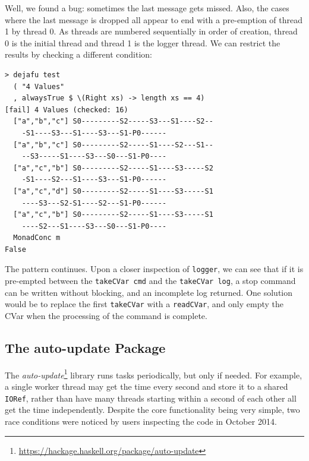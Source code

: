 Well, we found a bug: sometimes the last message gets missed. Also,
the cases where the last message is dropped all appear to end with a
pre-emption of thread 1 by thread 0. As threads are numbered
sequentially in order of creation, thread 0 is the initial thread and
thread 1 is the logger thread. We can restrict the results by checking
a different condition:

\begin{verbatim}
> dejafu test
  ( "4 Values"
  , alwaysTrue $ \(Right xs) -> length xs == 4)
[fail] 4 Values (checked: 16)
  ["a","b","c"] S0---------S2-----S3---S1----S2--
    -S1----S3---S1----S3---S1-P0------
  ["a","b","c"] S0---------S2-----S1----S2---S1--
    --S3-----S1----S3---S0---S1-P0----
  ["a","c","b"] S0---------S2-----S1----S3-----S2
    -S1----S2---S1----S3---S1-P0------
  ["a","c","d"] S0---------S2-----S1----S3-----S1
    ----S3---S2-S1----S2---S1-P0------
  ["a","c","b"] S0---------S2-----S1----S3-----S1
    ----S2---S1----S3---S0---S1-P0----
  MonadConc m
False
\end{verbatim}

The pattern continues. Upon a closer inspection of \texttt{logger}, we
can see that if it is pre-empted between the \texttt{takeCVar cmd} and
the \texttt{takeCVar log}, a stop command can be written without
blocking, and an incomplete log returned. One solution would be to
replace the first \texttt{takeCVar} with a \texttt{readCVar}, and only
empty the CVar when the processing of the command is complete.

\subsection*{The auto-update Package}
\label{sec:dejafu-example-autoupdate}

The
\textit{auto-update}\footnote{\url{https://hackage.haskell.org/package/auto-update}}
library runs tasks periodically, but only if needed. For example, a
single worker thread may get the time every second and store it to a
shared \texttt{IORef}, rather than have many threads starting within a
second of each other all get the time
independently\cite{autoupdate}. Despite the core functionality being
very simple, two race conditions were noticed by users inspecting the
code in October 2014.

